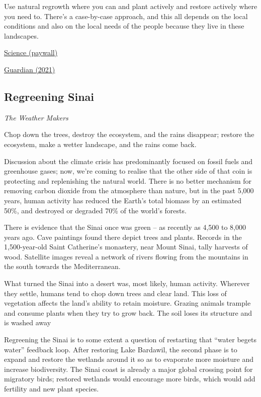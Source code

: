 \documentclass[
]{book}
\begin{document}
Use natural regrowth where you can and plant actively and restore actively where you need to. There's a case-by-case approach, and this all depends on the local conditions and also on the local needs of the people because they live in these landscapes.

\href{http://www.science.org/doi/10.1126/science.abh3629}{Science (paywall)}

\href{https://www.theguardian.com/environment/2021/dec/09/tropical-forests-can-regenerate-in-just-20-years-without-human-interference}{Guardian (2021)}

\hypertarget{regreening-sinai}{%
\subsection{Regreening Sinai}\label{regreening-sinai}}

\emph{The Weather Makers}

Chop down the trees, destroy the ecosystem, and the rains disappear;
restore the ecosystem, make a wetter landscape, and the rains come back.

Discussion about the climate crisis has predominantly focused on fossil fuels and greenhouse gases;
now, we're coming to realise that the other side of that coin is
protecting and replenishing the natural world.
There is no better mechanism for removing carbon dioxide from the atmosphere than nature, but in the past 5,000 years, human activity has reduced the Earth's total biomass by an estimated 50\%, and destroyed or degraded 70\% of the world's forests.

There is evidence that the Sinai once was green -- as recently as 4,500 to 8,000 years ago. Cave paintings found there depict trees and plants. Records in the 1,500-year-old Saint Catherine's monastery, near Mount Sinai, tally harvests of wood. Satellite images reveal a network of rivers flowing from the mountains in the south towards the Mediterranean.

What turned the Sinai into a desert was, most likely, human activity. Wherever they settle, humans tend to chop down trees and clear land. This loss of vegetation affects the land's ability to retain moisture. Grazing animals trample and consume plants when they try to grow back. The soil loses its structure and is washed away

Regreening the Sinai is to some extent a question of restarting that ``water begets water'' feedback loop. After restoring Lake Bardawil, the second phase is to expand and restore the wetlands around it so as to evaporate more moisture and increase biodiversity. The Sinai coast is already a major global crossing point for migratory birds; restored wetlands would encourage more birds, which would add fertility and new plant species.
\end{document}
